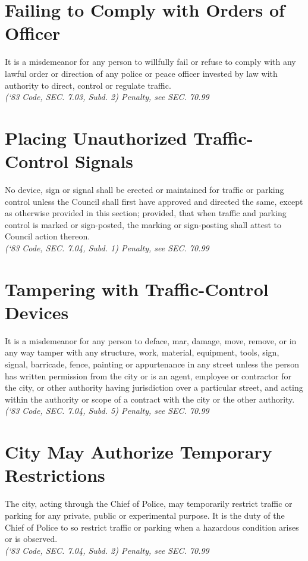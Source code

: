 \section{Failing to Comply with Orders of Officer}
It is a misdemeanor for any person to willfully fail or refuse to comply with any lawful order or direction of any police or peace officer invested by law with authority to direct, control or regulate traffic.\\
\emph{(‘83 Code, SEC. 7.03, Subd. 2)  Penalty, see SEC. 70.99}
\section{Placing Unauthorized Traffic-Control Signals}
No device, sign or signal shall be erected or maintained for traffic or parking control unless the Council shall first have approved and directed the same, except as otherwise provided in this section; provided, that when traffic and parking control is marked or sign-posted, the marking or sign-posting shall attest to Council action thereon.\\
\emph{(‘83 Code, SEC. 7.04, Subd. 1)  Penalty, see SEC. 70.99}
\section{Tampering with Traffic-Control Devices}
It is a misdemeanor for any person to deface, mar, damage, move, remove, or in any way tamper with any structure, work, material, equipment, tools, sign, signal, barricade, fence, painting or appurtenance in any street unless the person has written permission from the city or is an agent, employee or contractor for the city, or other authority having jurisdiction over a particular street, and acting within the authority or scope of a contract with the city or the other authority.\\
\emph{(‘83 Code, SEC. 7.04, Subd. 5)  Penalty, see SEC. 70.99}
\section{City May Authorize Temporary Restrictions}
The city, acting through the Chief of Police, may temporarily restrict traffic or parking for any private, public or experimental purpose.  It is the duty of the Chief of Police to so restrict traffic or parking when a hazardous condition arises or is observed.\\
\emph{(‘83 Code, SEC. 7.04, Subd. 2)  Penalty, see SEC. 70.99}

